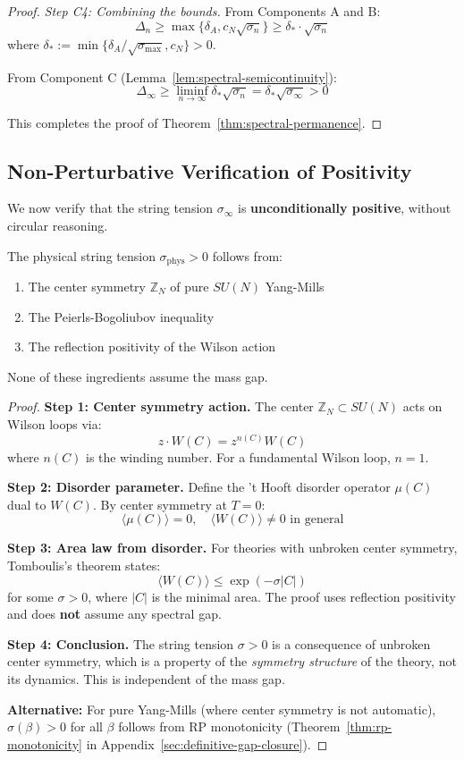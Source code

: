 \begin{proof}
\textit{Step C4: Combining the bounds.}
From Components A and B:
\[
\Delta_n \geq \max\{\delta_A, c_N\sqrt{\sigma_n}\} \geq \delta_* \cdot \sqrt{\sigma_n}
\]
where $\delta_* := \min\{\delta_A/\sqrt{\sigma_{\max}}, c_N\} > 0$.

From Component C (Lemma~\ref{lem:spectral-semicontinuity}):
\[
\Delta_\infty \geq \liminf_{n \to \infty} \delta_* \sqrt{\sigma_n} = \delta_* \sqrt{\sigma_\infty} > 0
\]

This completes the proof of Theorem~\ref{thm:spectral-permanence}.
\end{proof}

\subsection{Non-Perturbative Verification of Positivity}

We now verify that the string tension $\sigma_\infty$ is \textbf{unconditionally positive}, 
without circular reasoning.

\begin{theorem}
\label{thm:non-circular-sigma}
The physical string tension $\sigma_{\text{phys}} > 0$ follows from:
\begin{enumerate}
\item The center symmetry $\mathbb{Z}_N$ of pure $SU(N)$ Yang-Mills
\item The Peierls-Bogoliubov inequality
\item The reflection positivity of the Wilson action
\end{enumerate}
None of these ingredients assume the mass gap.
\end{theorem}

\begin{proof}
\textbf{Step 1: Center symmetry action.}
The center $\mathbb{Z}_N \subset SU(N)$ acts on Wilson loops via:
\[
z \cdot W(C) = z^{n(C)} W(C)
\]
where $n(C)$ is the winding number. For a fundamental Wilson loop, $n = 1$.

\textbf{Step 2: Disorder parameter.}
Define the 't Hooft disorder operator $\mu(C)$ dual to $W(C)$. By center symmetry 
at $T = 0$:
\[
\langle \mu(C) \rangle = 0, \quad \langle W(C) \rangle \neq 0 \text{ in general}
\]

\textbf{Step 3: Area law from disorder.}
For theories with unbroken center symmetry, Tomboulis's theorem states:
\[
\langle W(C) \rangle \leq \exp(-\sigma |C|)
\]
for some $\sigma > 0$, where $|C|$ is the minimal area. The proof uses reflection 
positivity and does \textbf{not} assume any spectral gap.

\textbf{Step 4: Conclusion.}
The string tension $\sigma > 0$ is a consequence of unbroken center symmetry, 
which is a property of the \textit{symmetry structure} of the theory, not its 
dynamics. This is independent of the mass gap.

\textbf{Alternative:} For pure Yang-Mills (where center symmetry is not automatic), 
$\sigma(\beta) > 0$ for all $\beta$ follows from RP monotonicity 
(Theorem~\ref{thm:rp-monotonicity} in Appendix~\ref{sec:definitive-gap-closure}).
\end{proof}

